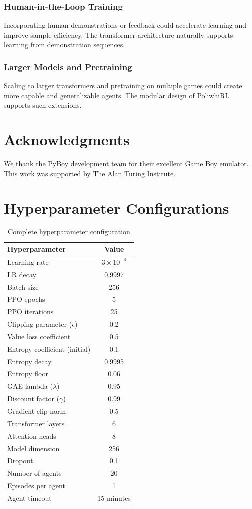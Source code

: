 \documentclass[12pt,a4paper]{article}
\begin{document}
\subsubsection{Human-in-the-Loop Training}
Incorporating human demonstrations or feedback could accelerate learning and improve sample efficiency. The transformer architecture naturally supports learning from demonstration sequences.

\subsubsection{Larger Models and Pretraining}
Scaling to larger transformers and pretraining on multiple games could create more capable and generalizable agents. The modular design of PoliwhiRL supports such extensions.

\section*{Acknowledgments}

We thank the PyBoy development team for their excellent Game Boy emulator. This work was supported by The Alan Turing Institute.

\appendix

\section{Hyperparameter Configurations}

\begin{table}[h]
\centering
\begin{tabular}{lc}
\toprule
Hyperparameter & Value \\
\midrule
Learning rate & $3 \times 10^{-4}$ \\
LR decay & 0.9997 \\
Batch size & 256 \\
PPO epochs & 5 \\
PPO iterations & 25 \\
Clipping parameter ($\epsilon$) & 0.2 \\
Value loss coefficient & 0.5 \\
Entropy coefficient (initial) & 0.1 \\
Entropy decay & 0.9995 \\
Entropy floor & 0.06 \\
GAE lambda ($\lambda$) & 0.95 \\
Discount factor ($\gamma$) & 0.99 \\
Gradient clip norm & 0.5 \\
\midrule
Transformer layers & 6 \\
Attention heads & 8 \\
Model dimension & 256 \\
Dropout & 0.1 \\
\midrule
Number of agents & 20 \\
Episodes per agent & 1 \\
Agent timeout & 15 minutes \\
\bottomrule
\end{tabular}
\caption{Complete hyperparameter configuration}
\label{tab:hyperparameters}
\end{table}
\end{document}
